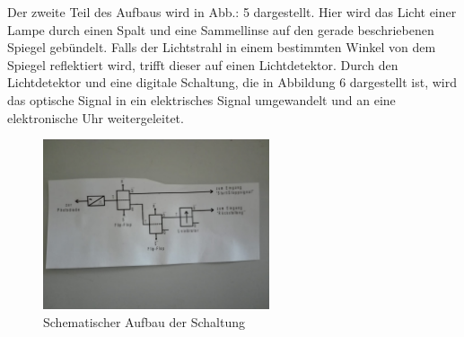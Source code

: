 Der zweite Teil des Aufbaus wird in Abb.: 5 dargestellt.
Hier wird das Licht einer Lampe durch einen Spalt und eine Sammellinse auf den gerade beschriebenen Spiegel gebündelt.
Falls der Lichtstrahl in einem bestimmten Winkel von dem Spiegel reflektiert wird, trifft dieser auf einen Lichtdetektor.
Durch den Lichtdetektor und eine digitale Schaltung, die in Abbildung 6 dargestellt ist, wird das optische Signal in ein elektrisches Signal umgewandelt und an eine elektronische Uhr weitergeleitet.

\begin{figure}[h]
  \centering
  \includegraphics[height=5cm]{Grafiken/Schaltung foto.jpg}
  \caption{Schematischer Aufbau der Schaltung}
  \label{fig:Schaltung}
\end{figure} 



